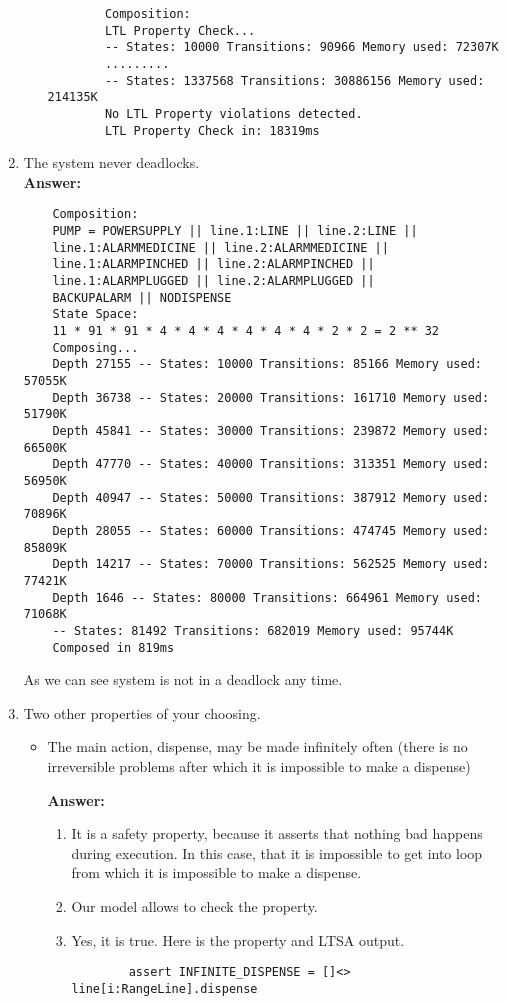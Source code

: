 \documentclass{article}
\begin{document}
\begin{enumerate}
\begin{enumerate}
\begin{verbatim}
    	Composition:
    	LTL Property Check...
    	-- States: 10000 Transitions: 90966 Memory used: 72307K
    	.........
    	-- States: 1337568 Transitions: 30886156 Memory used: 214135K
    	No LTL Property violations detected.
    	LTL Property Check in: 18319ms
\end{verbatim}
	\end{enumerate}
    \item The system never deadlocks.\\
    \textbf{Answer:}
    \begin{verbatim}
    Composition:
    PUMP = POWERSUPPLY || line.1:LINE || line.2:LINE || 
    line.1:ALARMMEDICINE || line.2:ALARMMEDICINE ||
    line.1:ALARMPINCHED || line.2:ALARMPINCHED ||
    line.1:ALARMPLUGGED || line.2:ALARMPLUGGED || 
    BACKUPALARM || NODISPENSE
    State Space:
    11 * 91 * 91 * 4 * 4 * 4 * 4 * 4 * 4 * 2 * 2 = 2 ** 32
    Composing...
    Depth 27155 -- States: 10000 Transitions: 85166 Memory used: 57055K
    Depth 36738 -- States: 20000 Transitions: 161710 Memory used: 51790K
    Depth 45841 -- States: 30000 Transitions: 239872 Memory used: 66500K
    Depth 47770 -- States: 40000 Transitions: 313351 Memory used: 56950K
    Depth 40947 -- States: 50000 Transitions: 387912 Memory used: 70896K
    Depth 28055 -- States: 60000 Transitions: 474745 Memory used: 85809K
    Depth 14217 -- States: 70000 Transitions: 562525 Memory used: 77421K
    Depth 1646 -- States: 80000 Transitions: 664961 Memory used: 71068K
    -- States: 81492 Transitions: 682019 Memory used: 95744K
    Composed in 819ms
    \end{verbatim}
    As we can see system is not in a deadlock any time.
    
    \item Two other properties of your choosing.
    
    \begin{itemize}
    \item The main action, dispense, may be made infinitely often (there is no irreversible problems after which it is
    impossible to make a dispense)
    
    \textbf{Answer:}
    \begin{enumerate}
    	\item It is a safety property, because it asserts that nothing bad happens during execution. In this case, that it is
    	impossible to get into loop from which it is impossible to make a dispense.
    	\item Our model allows to check the property. 
    	\item Yes, it is true. Here is the property and LTSA output.
    	\begin{verbatim}    	
    	assert INFINITE_DISPENSE = []<> line[i:RangeLine].dispense
    	 \end{verbatim}
    	 

\end{enumerate}
\end{itemize}
\end{enumerate}
\end{document}
